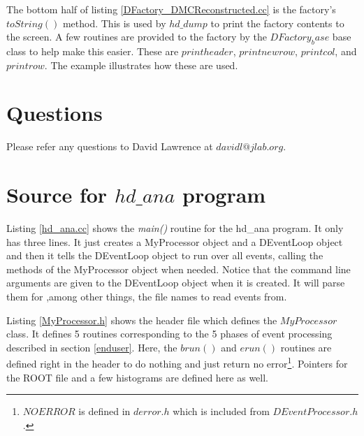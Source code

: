 \documentclass[12pt]{article}
\begin{document}



The bottom half of listing \ref{DFactory_DMCReconstructed.cc} is
the factory's $toString()$ method. This is used by $hd\_dump$
to print the factory contents to the screen. A few routines are
provided to the factory by the $DFactory_base$ base class to
help make this easier. These are $printheader$, $printnewrow$,
$printcol$, and $printrow$. The example illustrates how these
are used.

\section{Questions}
Please refer any questions to David Lawrence at $davidl@jlab.org$.

\newpage
\appendix
\section{Source for $hd\_ana$ program}
\label{hd_ana_src}

Listing \ref{hd_ana.cc} shows the {\it main()} routine for the
hd\_ana program. It only has three lines. It just creates a MyProcessor
object and a DEventLoop object and then it tells the DEventLoop object
to run over all events, calling the methods of the MyProcessor object
when needed. Notice that the command line arguments are given to 
the DEventLoop object when it is created. It will parse them for
,among other things, the file names to read events from.



\newpage
Listing \ref{MyProcessor.h} shows the header file which defines the
$MyProcessor$ class. It defines 5 routines corresponding to the 5
phases of event processing described in section \ref{enduser}. Here,
the $brun()$ and $erun()$ routines are defined right in the header
to do nothing and just return no error\footnote{$NOERROR$ is defined
in $derror.h$ which is included from $DEventProcessor.h$.}. Pointers
for the ROOT file and a few histograms are defined here as well.


\end{document}
